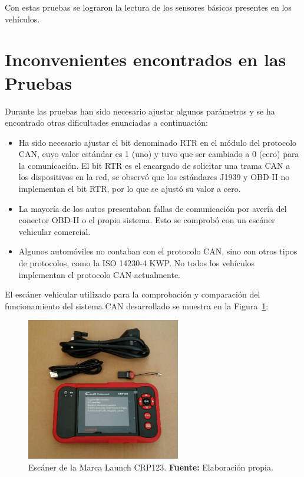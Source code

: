 Con estas pruebas se lograron la lectura de los sensores básicos presentes en los vehículos. 

\section{Inconvenientes encontrados en las Pruebas}

Durante las pruebas han sido necesario ajustar algunos parámetros y se ha encontrado otras dificultades enunciadas a continuación: 
\begin{itemize}
    \item Ha sido necesario ajustar el bit denominado RTR en el módulo del protocolo CAN, cuyo valor estándar es 1 (uno) y tuvo que ser cambiado a 0 (cero) para la comunicación. El bit RTR es el encargado de solicitar una trama CAN a los dispositivos en la red, se observó que los estándares J1939 y OBD-II no implementan el bit RTR, por lo que se ajustó su valor a cero. 
    
    \item La mayoría de los autos presentaban fallas de comunicación por avería del conector OBD-II o el propio sistema. Esto se comprobó con un escáner vehicular comercial. 
    
    \item Algunos automóviles  no contaban con el protocolo CAN, sino con otros tipos de protocolos, como la ISO 14230-4 KWP. No todos los vehículos  implementan el protocolo CAN actualmente. 
    
\end{itemize}


El escáner vehicular utilizado para la comprobación  y comparación del funcionamiento del sistema CAN desarrollado se muestra en la Figura~\ref{scaner_fig_c6}: 

\begin{figure}[H]
	\centering
	\includegraphics[width=0.6\textwidth]{./Cap6imagen/scaner_fig_c6.png}
	\caption [Escáner de la Marca Launch CRP123.]{Escáner de la Marca Launch CRP123.  \textbf{ Fuente:} %
		Elaboración propia.}
	\label{scaner_fig_c6} %
\end{figure}


